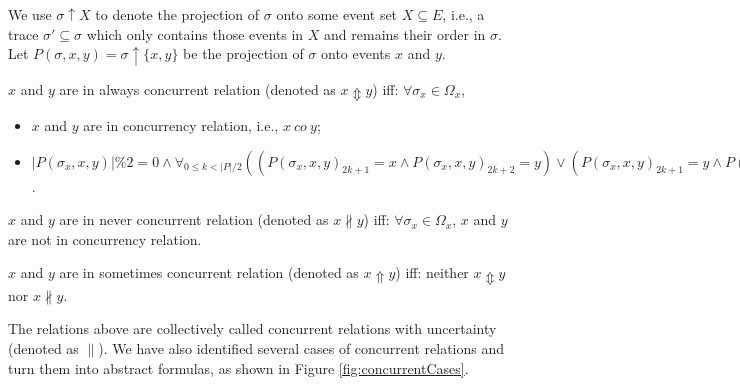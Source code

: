 \documentclass{llncs}
\begin{document}
We use $\sigma\uparrow X$ to denote the projection of $\sigma$ onto some event set $X\subseteq E$, i.e., a trace $\sigma'\subseteq\sigma$ which only contains those events in $X$ and remains their order in $\sigma$. Let $P(\sigma,x,y)=\sigma\uparrow\{x,y\}$ be the projection of $\sigma$ onto events $x$ and $y$.

\begin{definition}\label{def:alwaysConcurrent}
$x$ and $y$ are in always concurrent relation (denoted as $x\Updownarrow y$) iff: $\forall\sigma_{x}\in\Omega_{x}$,
	\begin{itemize}
		\item[-] $x$ and $y$ are in concurrency relation, i.e., $x~co~y$;
		\item[-] $|P(\sigma_{x},x,y)|\%2=0\wedge\forall_{0\leq k<|P|/2}((P(\sigma_{x},x,y)_{2k+1}=x\wedge P(\sigma_{x},x,y)_{2k+2}=y)\vee(P(\sigma_{x},x,y)_{2k+1}=y\wedge P(\sigma_{x},x,y)_{2k+2}=x)\vee(P(\sigma_{x},x,y)_{2k+1}=y\wedge P(\sigma_{x},x,y)_{2k+2}=y))$.
	\end{itemize}
\end{definition}

\begin{definition}\label{def:neverConcurrent}
$x$ and $y$ are in never concurrent relation (denoted as $x\nparallel y$) iff: $\forall\sigma_{x}\in\Omega_{x}$, $x$ and $y$ are not in concurrency relation.
\end{definition}

\begin{definition}\label{def:sometimesConcurrent}
$x$ and $y$ are in sometimes concurrent relation (denoted as $x\Uparrow y$) iff: neither $x\Updownarrow y$ nor $x\nparallel y$.
\end{definition}

The relations above are collectively called concurrent relations with uncertainty (denoted as $\parallel$). We have also identified several cases of concurrent relations and turn them into abstract formulas, as shown in Figure \ref{fig:concurrentCases}.
\end{document}
